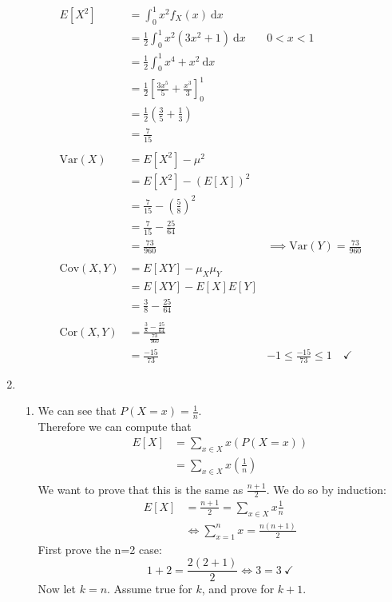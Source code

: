 \documentclass{article}
\makeatletter
\theoremstyle{definition}
\theoremstyle{remark}
\theoremstyle{example}
\newcommand{\Var}[1]{\mathrm{Var}\left(#1\right)}
\newcommand{\Cov}[1]{\mathrm{Cov}\left(#1\right)}
\newcommand{\Cor}[1]{\mathrm{Cor}\left(#1\right)}
\renewcommand{\d}{\ \mathrm{d}}
\newcommand{\skipitems}[1]{%
	\addtocounter{\@enumctr}{#1}%
}
\makeatother
\begin{document}
\begin{enumerate}
\begin{align*}
		\end{align*}
		\begin{align*}
			E[X^2] & = \int_{0}^{1}x^2 f_X(x) \d x\\
			&= \frac12 \int_{0}^{1}x^2 \left(3x^2+1\right) \d x & 0 < x < 1\\
			&= \frac12 \int_{0}^{1}x^4+x^2 \d x\\
			&= \frac12 \left[\frac{3x^5}{5}+\frac{x^3}{3}\right]_0^1\\
			&= \frac12 \left(\frac35+\frac13\right)\\
			&= \frac7{15}\\
			\\
			\Var{X}&=E[X^2]-\mu^2\\
			&= E[X^2]-(E[X])^2\\
			&= \frac7{15}-\left(\frac58\right)^2\\
			&= \frac7{15}-\frac{25}{64}\\
			&= \frac{73}{960} & \implies \Var{Y}=\frac{73}{960}\\
			\\
			\Cov{X,Y}&=E[XY]-\mu_X\mu_Y\\
			&= E[XY]-E[X]E[Y]\\
			&= \frac38 -\frac{25}{64}\\
			\\
			\Cor{X,Y}&=\frac{\frac{3}{8}-\frac{25}{64}}{\frac{73}{960}}\\
			&= \frac{-15}{73} & -1 \leq \frac{-15}{73} \leq 1 \quad \checkmark
		\end{align*}
		\skipitems{1}
		\item \begin{enumerate}
			\item We can see that $P(X=x)=\frac1n$.\\
			Therefore we can compute that \begin{align*}
				E[X]&=\sum_{x \in X} x \left(P(X=x)\right)\\
				&=\sum_{x \in X} x \left(\frac1n\right)\\
			\end{align*}
			We want to prove that this is the same as $\frac{n+1}{2}$. We do so by induction:
			\begin{align*}
				E[X] &= \frac{n+1}{2} = \sum_{x \in X}x\frac{1}{n}\\
				& \iff \sum_{x=1}^{n}x = \frac{n(n+1)}{2}
			\end{align*}
			First prove the n=2 case:
			\[ 1+2 = \frac{2(2+1)}{2} \iff 3 = 3 \ \checkmark\]
			Now let $k=n$. Assume true for $k$, and prove for $k+1$.

\end{enumerate}
\end{enumerate}
\end{document}
